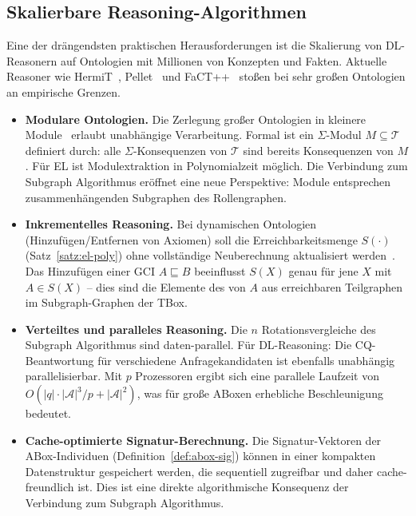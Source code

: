 ﻿\documentclass[a4paper,12pt]{article}
\theoremstyle{definition}
\theoremstyle{plain}
\theoremstyle{remark}
\newcommand{\Tbox}{\ensuremath{\mathcal{T}}}
\newcommand{\Abox}{\ensuremath{\mathcal{A}}}
\begin{document}
\subsection{Skalierbare Reasoning-Algorithmen}

Eine der dr{\"a}ngendsten praktischen Herausforderungen ist die Skalierung
von DL-Reasonern auf Ontologien mit Millionen von Konzepten und Fakten.
Aktuelle Reasoner wie HermiT~\cite{Glimm2014}, Pellet~\cite{Sirin2007}
und FaCT++~\cite{Tsarkov2006} sto{\ss}en bei sehr gro{\ss}en Ontologien
an empirische Grenzen.

\begin{itemize}
  \item \textbf{Modulare Ontologien.}
        Die Zerlegung gro{\ss}er Ontologien in kleinere Module~\cite{Grau2008}
        erlaubt unabh{\"a}ngige Verarbeitung.
        Formal ist ein $\Sigma$-Modul $M \subseteq \Tbox$ definiert durch:
        alle $\Sigma$-Konsequenzen von $\Tbox$ sind bereits Konsequenzen von $M$.
        F{\"u}r \textsf{EL} ist Modulextraktion in Polynomialzeit m{\"o}glich.
        Die Verbindung zum Subgraph Algorithmus er{\"o}ffnet eine neue Perspektive:
        Module entsprechen zusammenh{\"a}ngenden Subgraphen des Rollengraphen.

  \item \textbf{Inkrementelles Reasoning.}
        Bei dynamischen Ontologien (Hinzuf{\"u}gen/Entfernen von Axiomen)
        soll die Erreichbarkeitsmenge $S(\cdot)$ (Satz~\ref{satz:el-poly})
        ohne vollst{\"a}ndige Neuberechnung aktualisiert werden~\cite{Baader2017}.
        Das Hinzuf{\"u}gen einer GCI $A \sqsubseteq B$ beeinflusst
        $S(X)$ genau f{\"u}r jene $X$ mit $A \in S(X)$ -- dies sind
        die Elemente des von $A$ aus erreichbaren Teilgraphen im
        Subgraph-Graphen der TBox.

  \item \textbf{Verteiltes und paralleles Reasoning.}
        Die $n$ Rotationsvergleiche des Subgraph Algorithmus sind daten-parallel.
        F{\"u}r DL-Reasoning: Die CQ-Beantwortung f{\"u}r verschiedene
        Anfragekandidaten ist ebenfalls unabh{\"a}ngig parallelisierbar.
        Mit $p$ Prozessoren ergibt sich eine parallele Laufzeit von
        $O(|q| \cdot |\Abox|^3 / p + |\Abox|^2)$, was f{\"u}r gro{\ss}e
        ABoxen erhebliche Beschleunigung bedeutet.

  \item \textbf{Cache-optimierte Signatur-Berechnung.}
        Die Signatur-Vektoren der ABox-Individuen (Definition~\ref{def:abox-sig})
        k{\"o}nnen in einer kompakten Datenstruktur gespeichert werden,
        die sequentiell zugreifbar und daher cache-freundlich ist.
        Dies ist eine direkte algorithmische Konsequenz der
        Verbindung zum Subgraph Algorithmus.
\end{itemize}
\end{document}
